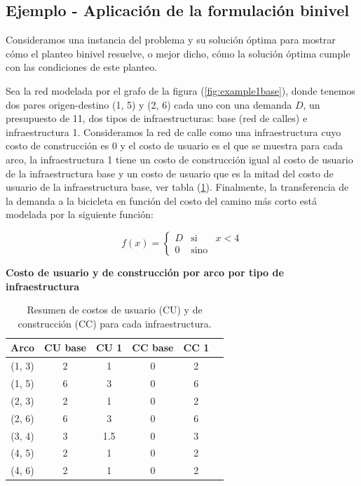 \documentclass{article}
\begin{document}
  \subsection{Ejemplo - Aplicación de la formulación binivel}

  Consideramos una instancia del problema y su solución óptima para mostrar cómo el planteo binivel resuelve, o mejor dicho, cómo la solución óptima cumple con las condiciones de este planteo.

  Sea la red modelada por el grafo de la figura (\ref{fig:example1base}), donde tenemos dos pares origen-destino (1, 5) y (2, 6) cada uno con una demanda $D$, un presupuesto de 11, dos tipos de infraestructuras: base (red de calles) e infraestructura 1. Consideramos la red de calle como una infraestructura cuyo costo de construcción es 0 y el costo de usuario es el que se muestra para cada arco, la infraestructura 1 tiene un costo de construcción igual al costo de usuario de la infraestructura base y un costo de usuario que es la mitad del costo de usuario de la infraestructura base, ver tabla (\ref{table:example1arccosts}). Finalmente, la transferencia de la demanda a la bicicleta en función del costo del camino más corto está modelada por la siguiente función:

  $$
    f(x) = \left\{ \begin{array}{lcr}
            D & \mbox{si}   & x < 4 \\
            0 & \mbox{sino} &
    \end{array}
    \right.
  $$

  \begin{table}[h!]
    \centering
      \caption*{{\bf Costo de usuario y de construcción por arco por tipo de infraestructura}}
    \begin{tabular}{cccccc}
      \toprule
      Arco & CU base & CU 1 & CC base & CC 1 & \\
      \midrule
        (1, 3) & 2 & 1   & 0 & 2 \\
        (1, 5) & 6 & 3   & 0 & 6 \\
        (2, 3) & 2 & 1   & 0 & 2 \\
        (2, 6) & 6 & 3   & 0 & 6 \\
        (3, 4) & 3 & 1.5 & 0 & 3 \\
        (4, 5) & 2 & 1   & 0 & 2 \\
        (4, 6) & 2 & 1   & 0 & 2 \\
      \bottomrule
    \end{tabular}
      \caption{Resumen de costos de usuario (CU) y de construcción (CC) para cada infraestructura.}\label{table:example1arccosts}
  \end{table}
\end{document}
